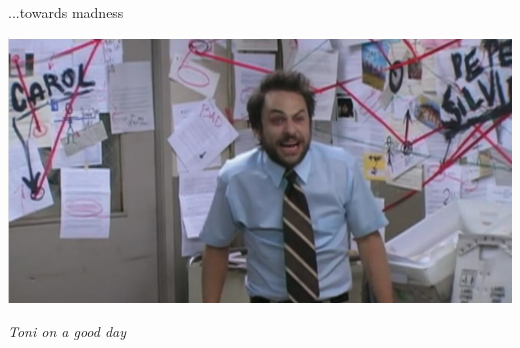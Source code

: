 \begin{frame}{...towards madness}
  \begin{center}
    \includegraphics[scale=.45]{./assets/chaos}

    \textit{Toni on a good day}
  \end{center}
\end{frame}

